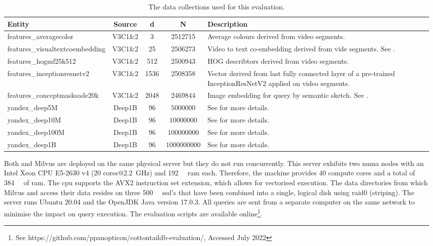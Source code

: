 \begin{table}
    \begin{tabular}{ | l | c | c | c | p{5cm} |}
        \hline
        \textbf{Entity} & \textbf{Source} & \textbf{d} & \textbf{N} & \textbf{Description} \\
        \hline
        \hline
        features\_averagecolor & V3C1\&2  & 3 & 2512715 & Average colours derived from video segments. \\ 
        \hline
        features\_visualtextcoembedding & V3C1\&2 & 25 & 2506273 & Video to text co-embedding derived from vide segments. See \cite{Spiess:2021Competitive}. \\
        \hline
        features\_hogmf25k512  & V3C1\&2  & 512 & 2500943 & HOG \cite{Bay:2006surf} describtors derived from video segments. \\
        \hline
        features\_inceptionresnetv2 & V3C1\&2  & 1536 & 2508358 & Vector derived from last fully connected layer of a pre-trained InceptionResNetV2 applied on video segments.\\
        \hline
        features\_conceptmasksade20k & V3C1\&2 & 2048 & 2469844 & Image embedding for query by semantic sketch. See \cite{Rossetto:2019Query}. \\
        \hline
        yandex\_deep5M  & Deep1B  & 96 & $5000000$ & See \cite{Babenko:2016Efficient} for more details. \\
        \hline
        yandex\_deep10M  & Deep1B & 96 & $10000000$ & See \cite{Babenko:2016Efficient} for more details. \\
        \hline
        yandex\_deep100M  & Deep1B & 96 & $100000000$ & See \cite{Babenko:2016Efficient} for more details. \\
        \hline
        yandex\_deep1B  & Deep1B & 96 & $1000000000$ & See \cite{Babenko:2016Efficient} for more details. \\
        \hline
        \hline
    \end{tabular}
    \caption{The data collections used for this evaluation. }
    \label{table:datasets}
\end{table}

Both \cottontail{} and Milvus are deployed on the same physical server but they do not run concurrently. This server exhibits two \acrshort{numa} nodes with an Intel Xeon CPU E5-2630 v4 (20 cores@\SI{2.2}{\giga\hertz}) and \SI{192}{\giga\byte} \acrshort{ram} each. Therefore, the machine provides 40 compute cores and a total of \SI{384}{\giga\byte} of \acrshort{ram}. The \acrshort{cpu} supports the AVX2 instruction set extension, which allows for vectorised execution. The data directories from which Milvus and \cottontail{} access their data resides on three \SI{500}{\giga\byte} \acrshort{ssd}'s that have been combined into a single, logical disk using \acrshort{raid}0 (striping). The server runs Ubuntu 20.04 and the OpenJDK Java version 17.0.3. All queries are sent from a separate computer on the same network to minimise the impact on query execution. The evaluation scripts are available online\footnote{See https://github.com/ppanopticon/cottontaildb-evaluation/, Accessed July 2022}.

